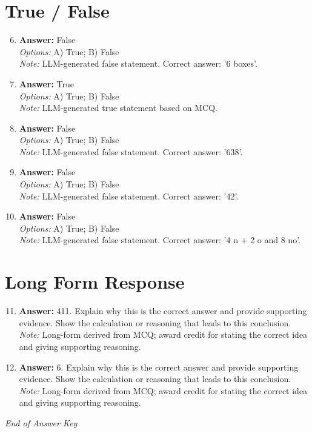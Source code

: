 \documentclass[12pt]{article}
\begin{document}
\section*{True / False}
\begin{enumerate}[label=\arabic*.]
\setcounter{enumi}{5}
\item \textbf{Answer:} False
\\ \textit{Options:} A) True; B) False
\\ \textit{Note:} LLM-generated false statement. Correct answer: '6 boxes'.
\item \textbf{Answer:} True
\\ \textit{Options:} A) True; B) False
\\ \textit{Note:} LLM-generated true statement based on MCQ.
\item \textbf{Answer:} False
\\ \textit{Options:} A) True; B) False
\\ \textit{Note:} LLM-generated false statement. Correct answer: '638'.
\item \textbf{Answer:} False
\\ \textit{Options:} A) True; B) False
\\ \textit{Note:} LLM-generated false statement. Correct answer: '42'.
\item \textbf{Answer:} False
\\ \textit{Options:} A) True; B) False
\\ \textit{Note:} LLM-generated false statement. Correct answer: '4 n + 2 o and 8 no'.
\end{enumerate}

\section*{Long Form Response}
\begin{enumerate}[label=\arabic*.]
\setcounter{enumi}{10}
\item \textbf{Answer:} 411. Explain why this is the correct answer and provide supporting evidence. Show the calculation or reasoning that leads to this conclusion.
\\ \textit{Note:} Long-form derived from MCQ; award credit for stating the correct idea and giving supporting reasoning.
\item \textbf{Answer:} 6. Explain why this is the correct answer and provide supporting evidence. Show the calculation or reasoning that leads to this conclusion.
\\ \textit{Note:} Long-form derived from MCQ; award credit for stating the correct idea and giving supporting reasoning.
\end{enumerate}

\vfill
\noindent\textit{End of Answer Key}
\end{document}
